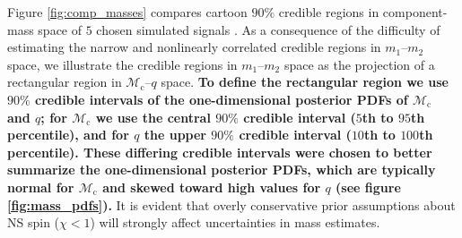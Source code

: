 Figure \ref{fig:comp_masses} compares cartoon $90\%$ credible regions in component-mass space of $5$ chosen simulated signals \citep[cf.][figure 1]{Chatziioannou_2014}.  As a consequence of the difficulty of estimating the narrow and nonlinearly correlated credible regions in $m_1$--$m_2$ space, we illustrate the credible regions in $m_1$--$m_2$ space as the projection of a rectangular region in $\mathcal{M}_\mathrm{c}$--$q$ space.  \textbf{To define the rectangular region we use $90\%$ credible intervals of the one-dimensional posterior PDFs of $\mathcal{M}_\mathrm{c}$ and $q$; for $\mathcal{M}_\mathrm{c}$ we use the central $90\%$ credible interval ($5$th to $95$th percentile), and for $q$ the upper $90\%$ credible interval ($10$th to $100$th percentile).  These differing credible intervals were chosen to better summarize the one-dimensional posterior PDFs, which are typically normal for $\mathcal{M}_\mathrm{c}$ and skewed toward high values for $q$ (see figure \ref{fig:mass_pdfs}).} It is evident that overly conservative prior assumptions about NS spin ($\chi < 1$) will strongly affect uncertainties in mass estimates.